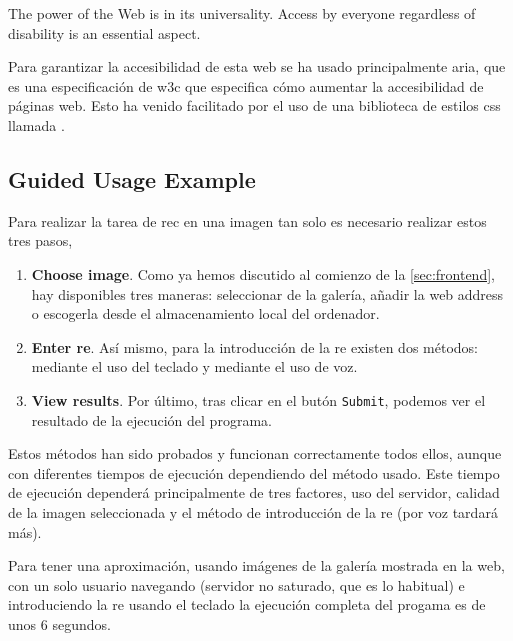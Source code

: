 \begin{quoteBox}
  The power of the Web is in its universality. Access by everyone regardless of
  disability is an essential aspect.
  \tcblower{}
\end{quoteBox}

Para garantizar la accesibilidad de esta web se ha usado principalmente
\gls{aria}, que es una especificación de \gls{w3c} que especifica cómo aumentar
la accesibilidad de páginas web. Esto ha venido facilitado por el uso de una
biblioteca de estilos \gls{css} llamada
.

\subsection{Guided Usage Example}

Para realizar la tarea de \gls{rec} en una imagen tan solo es necesario
realizar estos tres pasos,
\begin{enumerate}
  \item \textbf{Choose image}. Como ya hemos discutido al comienzo de la
  \vref{sec:frontend}, hay disponibles tres maneras: seleccionar de la galería,
  añadir la web address o escogerla desde el almacenamiento local del
  ordenador.
  \item \textbf{Enter \gls*{re}}. Así mismo, para la introducción de la
  \gls{re} existen dos métodos: mediante el uso del teclado y mediante el uso
  de voz.
  \item \textbf{View results}. Por último, tras clicar en el butón
  \texttt{Submit}, podemos ver el resultado de la ejecución del programa.
\end{enumerate}

Estos métodos han sido probados y funcionan correctamente todos ellos, aunque
con diferentes tiempos de ejecución dependiendo del método usado. Este tiempo
de ejecución dependerá principalmente de tres factores, uso del servidor,
calidad de la imagen seleccionada y el método de introducción de la \gls{re}
(por voz tardará más).

\begin{exampleBox}
  Para tener una aproximación, usando imágenes de la galería mostrada en la
  web, con un solo usuario navegando (servidor no saturado, que es lo habitual)
  e introduciendo la \gls{re} usando el teclado la ejecución completa del
  progama es de unos 6 segundos.
\end{exampleBox}


